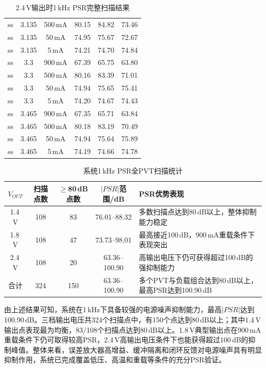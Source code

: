 \documentclass[a4paper, 12pt]{article}
\begin{document}
\begin{table}[H]
\begin{tabular}{lccccc}
    ss & 3.135 & 500\,mA & 80.15 & 84.82 & 73.46 \\
    ss & 3.135 & 50\,mA & 74.95 & 75.67 & 72.67 \\
    ss & 3.135 & 5\,mA & 74.21 & 74.70 & 74.84 \\
    ss & 3.3 & 900\,mA & 67.39 & 65.75 & 63.80 \\
    ss & 3.3 & 500\,mA & 80.16 & 83.39 & 71.01 \\
    ss & 3.3 & 50\,mA & 74.94 & 75.65 & 75.41 \\
    ss & 3.3 & 5\,mA & 74.20 & 74.67 & 74.43 \\
    ss & 3.465 & 900\,mA & 67.35 & 65.71 & 63.84 \\
    ss & 3.465 & 500\,mA & 80.18 & 83.19 & 70.49 \\
    ss & 3.465 & 50\,mA & 74.94 & 75.64 & 75.89 \\
    ss & 3.465 & 5\,mA & 74.19 & 74.66 & 74.78 \\
    \bottomrule
  \end{tabular}
  \caption{2.4\,V输出时1\,kHz PSR完整扫描结果}
  \label{tab:system-psr-2p4}
\end{table}
\begin{table}[H]
  \centering
  \footnotesize
  \setlength{\tabcolsep}{3pt}
  \begin{tabularx}{\textwidth}{ccccX}
    \toprule
    $V_{OUT}$ & 扫描点数 & $\geq$80\,dB点数 & $|PSR|$范围/dB & PSR优势表现 \\
    \midrule
    1.4\,V & 108 & 83 & 76.01--88.32 & 多数扫描点达到80\,dB以上，整体抑制能力稳定 \\
    1.8\,V & 108 & 47 & 73.73--98.01 & 最高接近100\,dB，900\,mA重载条件下表现突出 \\
    2.4\,V & 108 & 20 & 63.36--100.90 & 高输出电压下仍可获得超过100\,dB的强抑制能力 \\
    合计 & 324 & 150 & 63.36--100.90 & 多个PVT与负载组合达到80\,dB以上，最高PSR达到100.90\,dB \\
    \bottomrule
  \end{tabularx}
  \caption{系统1\,kHz PSR全PVT扫描统计}
  \label{tab:system-psr-summary}
\end{table}
由上述结果可知，系统在1\,kHz下具备较强的电源噪声抑制能力，最高$|PSR|$达到100.90\,dB。三档输出电压共324个扫描点中，有150个点达到80\,dB以上；其中1.4\,V输出点表现最为均衡，83/108个扫描点达到80\,dB以上。1.8\,V典型输出点在900\,mA重载条件下仍可取得较高PSR，2.4\,V高输出电压条件下也能获得超过100\,dB的抑制峰值。整体来看，误差放大器高增益、缓冲隔离和闭环反馈对电源噪声具有明显抑制作用，系统已完成覆盖低压、高温和重载等条件的充分PSR验证。
\end{document}
